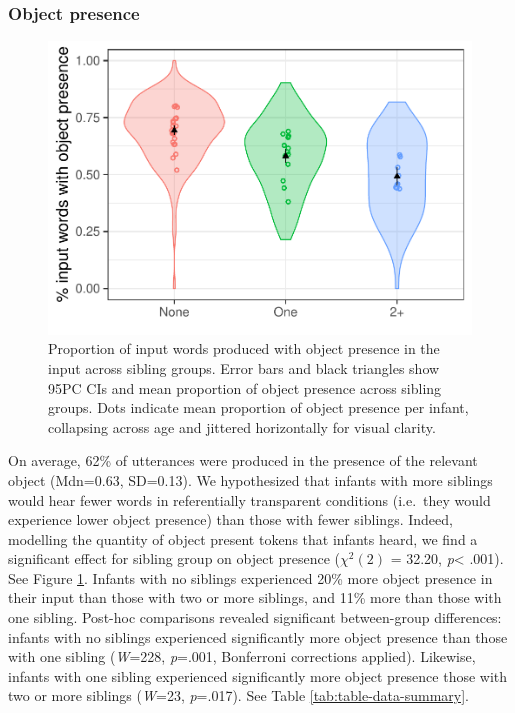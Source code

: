 \documentclass[man,floatsintext]{apa6}
\begin{document}
\hypertarget{object-presence}{%
\subsubsection{Object presence}\label{object-presence}}

\begin{figure}
\centering
\includegraphics{SiblingsStudyText_files/figure-latex/Figure-object-presence-1.pdf}
\caption{\label{fig:Figure-object-presence}Proportion of input words produced with object presence in the input across sibling groups. Error bars and black triangles show 95PC CIs and mean proportion of object presence across sibling groups. Dots indicate mean proportion of object presence per infant, collapsing across age and jittered horizontally for visual clarity.}
\end{figure}

On average, 62\% of utterances were produced in the presence of the relevant object (Mdn=0.63, SD=0.13). We hypothesized that infants with more siblings would hear fewer words in referentially transparent conditions (i.e.~they would experience lower object presence) than those with fewer siblings. Indeed, modelling the quantity of object present tokens that infants heard, we find a significant effect for sibling group on object presence (\(\chi^2 (2)\) = 32.20, \emph{p}\textless{} .001). See Figure \ref{fig:Figure-object-presence}. Infants with no siblings experienced 20\% more object presence in their input than those with two or more siblings, and 11\% more than those with one sibling. Post-hoc comparisons revealed significant between-group differences: infants with no siblings experienced significantly more object presence than those with one sibling (\emph{W}=228, \emph{p}=.001, Bonferroni corrections applied). Likewise, infants with one sibling experienced significantly more object presence those with two or more siblings (\emph{W}=23, \emph{p}=.017). See Table \ref{tab:table-data-summary}.
\end{document}
